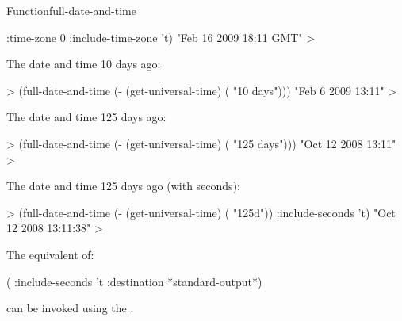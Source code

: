 \documentclass[10pt,twoside,english,pdftex]{article}
\begin{document}
\begin{functiondoc}{Function}{full-date-and-time}
\begin{example}
      :time-zone 0 
      :include-time-zone 't)
  "Feb 16 2009 18:11 GMT"
  >
\end{example}
%
The date and time 10 days ago:
%
%
\W\supp\notpretop
\begin{example}
  > (full-date-and-time (- (get-universal-time) ( "10 days")))
  "Feb  6 2009 13:11"
  >
\end{example}
%
The date and time 125 days ago:
%
\W\supp\notpretop
\begin{example}
  > (full-date-and-time (- (get-universal-time) ( "125 days")))
  "Oct 12 2008 13:11"
  >
\end{example}
%
The date and time 125 days ago (with seconds):
%
\W\supp\notpretop
\begin{example}
  > (full-date-and-time (- (get-universal-time) ( "125d"))
      :include-seconds 't)
  "Oct 12 2008 13:11:38"
  >
\end{example}

\replnote 
%
%
%
The equivalent of:
%
\W\supp
\begin{example}
  (  
     :include-seconds 't
     :destination *standard-output*)
\end{example} 
%
can be invoked using the  .

\end{functiondoc}

\end{document}
